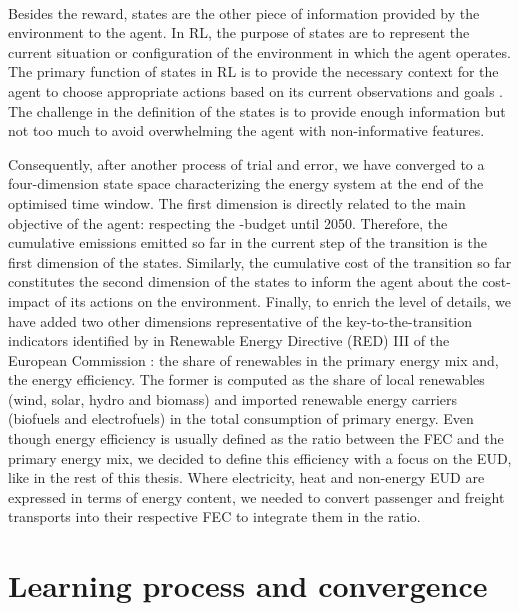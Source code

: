 \\

\noindent
Besides the reward, states are the other piece of information provided by the environment to the agent. In \gls{RL}, the purpose of states are to represent the current situation or configuration of the environment in which the agent operates. The primary function of states in RL is to provide the necessary context for the agent to choose appropriate actions based on its current observations and goals \cite{sutton2018reinforcement}. The challenge in the definition of the states is to provide enough information but not too much to avoid overwhelming the agent with non-informative features. 

Consequently, after another process of trial and error, we have converged to a four-dimension state space characterizing the energy system at the end of the optimised time window. The first dimension is directly related to the main objective of the agent: respecting the -budget until 2050. Therefore, the cumulative emissions emitted so far in the current step of the transition is the first dimension of the states. Similarly, the cumulative cost of the transition so far constitutes the second dimension of the states to inform the agent about the cost-impact of its actions on the environment. Finally, to enrich the level of details, we have added two other dimensions representative of the key-to-the-transition indicators identified by in Renewable Energy Directive (RED) III of the European Commission \cite{REDIII}: the share of renewables in the primary energy mix and, the energy efficiency. The former is computed as the share of local renewables (\ie wind, solar, hydro and biomass) and imported renewable energy carriers (\ie biofuels and electrofuels) in the total consumption of primary energy. Even though energy efficiency is usually defined as the ratio between the \gls{FEC} and the primary energy mix, we decided to define this efficiency with a focus on the \gls{EUD}, like in the rest of this thesis. Where electricity, heat and non-energy \gls{EUD} are expressed in terms of energy content, we needed to convert passenger and freight transports into their respective \gls{FEC} to integrate them in the ratio. 

\section{Learning process and convergence}
\label{sec:RL:learning}

